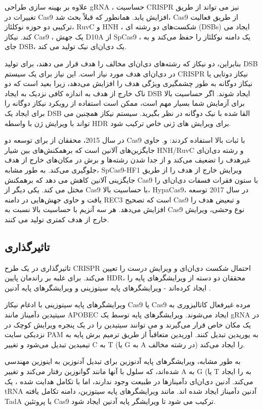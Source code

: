 \documentclass[12pt,a4paper,BCOR=.7cm,headsepline,bibliography=totoc]{report}
\begin{document}
علاوه بر بهینه سازی طراحی gRNA ، حساسیت CRISPR نیز می تواند از طریق تغییرات در Cas9 افزایش یابد. همانطور که قبلاً بحث شد، Cas9 از طریق فعالیت ترکیبی دو حوزه نوکلئاز، RuvC و HNH ، شکست‌های دو رشته ای (DSBs) ایجاد می کند. نیکاز Cas9 ، یک جهش D10A از SpCas9 ، یک دامنه نوکلئاز را حفظ می‌کند و به جای  DSB، یک دی‌ان‌ای نیک تولید می کند.

بنابراین، دو نیکاز که رشته‌های دی‌ان‌ای مخالف را هدف قرار می دهند، برای تولید DSB در دی‌ان‌ای هدف مورد نیاز است. این نیاز برای یک سیستم CRISPR نیکاز دوتایی یا نیکاز دوگانه به طور چشمگیری ویژگی هدف را افزایش می‌دهد، زیرا بعید است که دو ناک خارج از هدف به اندازه کافی نزدیک به ایجاد DSB ایجاد شوند. اگر حساسیت بالا برای آزمایش شما بسیار مهم است، ممکن است استفاده از رویکرد نیکاز دوگانه را برای ایجاد یک DSB القا شده با نیک دوگانه در نظر بگیرید. سیستم نیکاز همچنین می تواند با ویرایش ژن با واسطه HDR برای ویرایش های ژنی خاص ترکیب شود.

در سال 2015، محققان از 
 برای توسعه دو Cas9 با ثبات بالا استفاده کردند:
 و.   
  حاوی جایگزین‌های آلانین است که برهمکنش‌های بین شیار HNH/RuvC و رشته دی‌ان‌ای غیرهدف را تضعیف می‌کند و از جدا شدن رشته‌ها و برش در مکان‌های خارج از هدف جلوگیری می‌کند. به طور مشابه، SpCas9-HF1 ویرایش خارج از هدف را از طریق جایگزینی آلانین کاهش می دهد که برهمکنش Cas9 با ستون فقرات فسفات دی‌ان‌ای را مختل می کند. یکی دیگر از Cas9 با حساسیت بالا، HypaCas9، در سال 2017 توسعه یافت و حاوی جهش‌هایی در دامنه REC3 است که تصحیح Cas9 و تبعیض هدف را افزایش می‌دهد. 
هر سه آنزیم با حساسیت بالا نسبت به Cas9 نوع وحشی، ویرایش خارج از هدف کمتری تولید می کنند.

\subsection{تاثیرگذاری}
تاثیرگذاری در یک طرح CRISPR احتمال شکست دی‌ان‌ای و ویرایش درست را تعیین ‌می‌کند. برای غلبه بر راندمان پایین HDR، محققان دو دسته از ویرایشگرهای پایه را ایجاد کرده‌اند - ویرایشگرهای پایه سیتوزینی  و ویرایشگرهای پایه آدنین .

ویرایشگرهای پایه سیتوزینی با ادغام نیکاز Cas9 یا Cas9 مرده غیرفعال کاتالیزوری  به سیتیدین دآمیناز مانند APOBEC ایجاد می‌شوند. ویرایشگرهای پایه توسط یک gRNA در یک مکان خاص قرار می‌گیرند و می توانند سیتیدین را در یک پنجره ویرایش کوچک در نزدیکی سایت PAM به یوریدین تبدیل کنند. اوریدین متعاقباً از طریق ترمیم برش پایه به تیمیدین تبدیل می‌شود و تغییر C به T (یا G به A در رشته مخالف) را ایجاد می‌کند.

به طور مشابه، ویرایشگرهای پایه آدنوزین برای تبدیل آدنوزین به اینوزین مهندسی شده‌اند، که سلول با آنها مانند گوانوزین رفتار می‌کند و تغییر A به G (یا T به  را ایجاد می‌کند. آدنین دی‌ان‌ای دآمینازها در طبیعت وجود ندارند، اما با تکامل هدایت شده ، یک tRNA آدنین دآمیناز ایجاد شده اند. مانند ویرایشگرهای پایه سیتوزین، دامنه تکامل یافته TadA با پروتئین Cas9 ترکیب می شود تا ویرایشگر پایه آدنین ایجاد شود.
\end{document}
